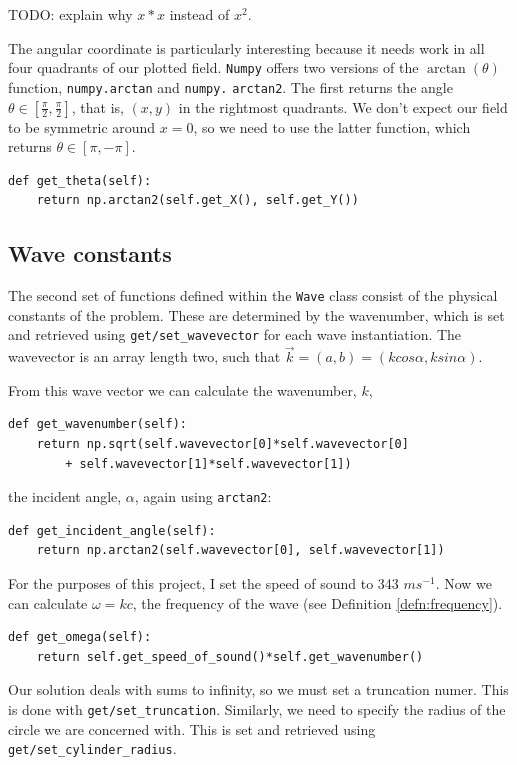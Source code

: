 %
TODO: explain why $x*x$ instead of $x^2$.\par
%
The angular coordinate is particularly interesting because it needs work in all four quadrants of our plotted field. \verb!Numpy! offers two versions of the $\arctan(\theta)$ function, \verb!numpy.arctan! and \verb!numpy.! \verb!arctan2!. The first returns the angle $\theta \in [\frac{\pi}{2},\frac{\pi}{2}]$, that is, $(x, y)$ in the rightmost quadrants. We don't expect our field to be symmetric around $x=0$, so we need to use the latter function, which returns $\theta \in [\pi, -\pi]$.
%
  \begin{lstlisting}
def get_theta(self):
    return np.arctan2(self.get_X(), self.get_Y())\end{lstlisting}\par
%
\subsection{Wave constants}
%
The second set of functions defined within the \verb!Wave! class consist of the physical constants of the problem. These are determined by the wavenumber, which is set and retrieved using \verb!get/set_wavevector! for each wave instantiation. The wavevector is an array length two, such that $\vec{k} = (a,b) = (kcos\alpha, ksin\alpha)$.\par
%
From this wave vector we can calculate the wavenumber, $k$,
%
  \begin{lstlisting}
def get_wavenumber(self):
    return np.sqrt(self.wavevector[0]*self.wavevector[0]
        + self.wavevector[1]*self.wavevector[1])\end{lstlisting}
%
the incident angle, $\alpha$, again using \verb!arctan2!:
%
  \begin{lstlisting}
def get_incident_angle(self):
    return np.arctan2(self.wavevector[0], self.wavevector[1])\end{lstlisting}\par
%
For the purposes of this project, I set the speed of sound to 343 $ms^{-1}$. Now we can calculate $\omega = k c$, the frequency of the wave (see Definition \ref{defn:frequency}).
%
  \begin{lstlisting}
def get_omega(self):
    return self.get_speed_of_sound()*self.get_wavenumber()\end{lstlisting} \par
%
Our solution deals with sums to infinity, so we must set a truncation numer. This is done with \verb!get/set_truncation!. Similarly, we need to specify the radius of the circle we are concerned with. This is set and retrieved using \verb!get/set_cylinder_radius!.
%

